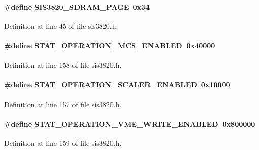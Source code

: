 \paragraph[{SIS3820\_\-SDRAM\_\-PAGE}]{\setlength{\rightskip}{0pt plus 5cm}\#define SIS3820\_\-SDRAM\_\-PAGE~0x34}\hfill\label{sis3820_8h_af10ec5fd434a1b0af47da844a72ce775}


Definition at line 45 of file sis3820.h.
\paragraph[{STAT\_\-OPERATION\_\-MCS\_\-ENABLED}]{\setlength{\rightskip}{0pt plus 5cm}\#define STAT\_\-OPERATION\_\-MCS\_\-ENABLED~0x40000}\hfill\label{sis3820_8h_acce612554ffbc00c5fa220bc624b349e}


Definition at line 158 of file sis3820.h.
\paragraph[{STAT\_\-OPERATION\_\-SCALER\_\-ENABLED}]{\setlength{\rightskip}{0pt plus 5cm}\#define STAT\_\-OPERATION\_\-SCALER\_\-ENABLED~0x10000}\hfill\label{sis3820_8h_ae724696bbb65fe0e34400e7e8471d0e5}


Definition at line 157 of file sis3820.h.
\paragraph[{STAT\_\-OPERATION\_\-VME\_\-WRITE\_\-ENABLED}]{\setlength{\rightskip}{0pt plus 5cm}\#define STAT\_\-OPERATION\_\-VME\_\-WRITE\_\-ENABLED~0x800000}\hfill\label{sis3820_8h_a5f3432eeb69075721333dc98702346f8}


Definition at line 159 of file sis3820.h.